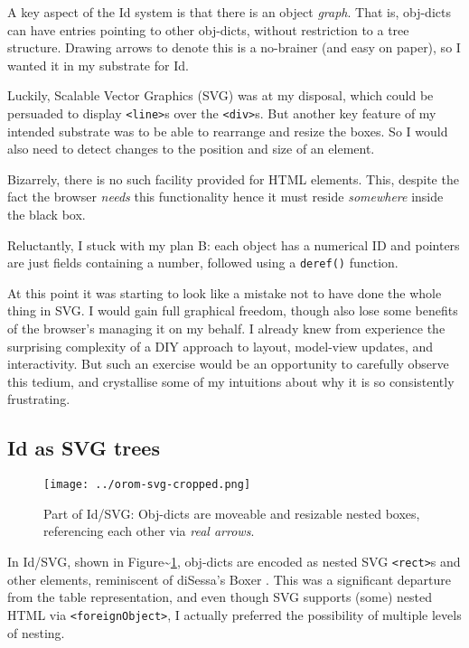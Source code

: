 A key aspect of the Id{} system is that there is an object \emph{graph}.
That is, obj-dicts can have entries pointing to other obj-dicts, without
restriction to a tree structure. Drawing arrows to denote this is a
no-brainer (and easy on paper), so I wanted it in my substrate for Id{}.

Luckily, Scalable Vector Graphics (SVG) was at my disposal, which could
be persuaded to display \texttt{\textless{}line\textgreater{}}s over the
\texttt{\textless{}div\textgreater{}}s. But another key feature of my
intended substrate was to be able to rearrange and resize the boxes. So
I would also need to detect changes to the position and size of an
element.

Bizarrely, there is no such facility provided for HTML elements. This,
despite the fact the browser \emph{needs} this functionality hence it
must reside \emph{somewhere} inside the black box.

Reluctantly, I stuck with my plan B: each object has a numerical ID and
pointers are just fields containing a number, followed using a
\texttt{deref()} function.

At this point it was starting to look like a mistake not to have done
the whole thing in SVG. I would gain full graphical freedom, though also
lose some benefits of the browser's managing it on my behalf. I already
knew from experience the surprising complexity of a DIY approach to
layout, model-view updates, and interactivity. But such an exercise
would be an opportunity to carefully observe this tedium, and
crystallise some of my intuitions about why it is so consistently
frustrating.

\hypertarget{as-svg-trees}{%
\subsection{\texorpdfstring{Id{} as SVG
trees}{ as SVG trees}}\label{as-svg-trees}}

\begin{figure}[h]
  \centering
  \texttt{[image: ../orom-svg-cropped.png]}
  \caption{Part of Id{}/SVG: Obj-dicts are moveable and resizable nested boxes,
           referencing each other via \emph{real arrows}.\label{fig:orom-svg}}
\end{figure}

In Id{}/SVG, shown in Figure\textasciitilde{}\ref{fig:orom-svg},
obj-dicts are encoded as nested SVG
\texttt{\textless{}rect\textgreater{}}s and other elements, reminiscent
of diSessa's Boxer \cite{boxer}. This was a significant departure from
the table representation, and even though SVG supports (some) nested
HTML via \texttt{\textless{}foreignObject\textgreater{}}, I actually
preferred the possibility of multiple levels of nesting.

